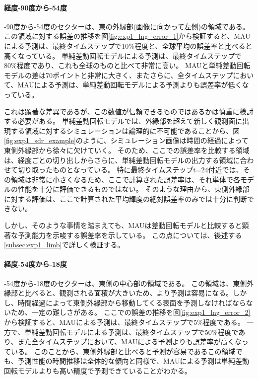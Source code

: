           \paragraph{経度-90度から-54度}
          -90度から-54度のセクターは、東の外縁部(画像に向かって左側)の領域である。
          この領域に対する誤差の推移を図\ref{fig:exp1_lng_error_1}から検証すると、MAUによる予測は、最終タイムステップで10\%程度と、全球平均の誤差率と比べると高くなっている。
          単純差動回転モデルによる予測は、最終タイムステップで80\%程度であり、これも全球のものと比べて非常に高い。
          MAUと単純差動回転モデルの差は70ポイントと非常に大きく、またさらに、全タイムステップにおいて、MAUによる予測は、単純差動回転モデルによる予測よりも誤差率が低くなっている。

          これは顕著な差異であるが、この数値が信頼できるものではあるかは慎重に検討する必要がある。
          単純差動回転モデルでは、外縁部を超えて新しく観測面に出現する領域に対するシミュレーションは論理的に不可能であることから、図\ref{fig:exp1_sdr_example}のように、シミュレーション画像は時間の経過によって東側外縁部から徐々に欠けていく。
          そのため、ここでの誤差率を比較する領域は、経度ごとの切り出しからさらに、単純差動回転モデルの出力する領域に合わせて切り取ったものとなっている。
          特に最終タイムステップt=24付近では、その領域は非常に小さくなるため、ここで計算された誤差率は、それ単体で各モデルの性能を十分に評価できるものではない。
          そのような理由から、東側外縁部に対する評価は、ここで計算された平均輝度の絶対誤差率のみでは十分に判断できない。
          
          しかし、そのような事情を踏まえても、MAUは差動回転モデルと比較すると顕著な予測能力を示唆する誤差率を示している。
          この点については、後述する\ref{subsec:exp1_limb}で詳しく検証する。

          \paragraph{経度-54度から-18度}
          -54度から-18度のセクターは、東側の中心部の領域である。
          この領域は、東側外縁部と比べると、観測される面積が大きいため、より予測は容易になる。しかし、時間経過によって東側外縁部から移動してくる表面を予測しなければならないため、一定の難しさがある。
          ここでの誤差の推移を図\ref{fig:exp1_lng_error_2}から検証すると、MAUによる予測は、最終タイムステップで5\%程度である。
          一方で、単純差動回転モデルによる予測は、最終タイムステップで50\%程度であり、また全タイムステップにおいて、MAUによる予測よりも誤差率が高くなっている。
          このことから、東側外縁部と比べると予測が容易であるこの領域でも、予測性能の時間推移は全体的な傾向と同様で、MAUによる予測は単純差動回転モデルよりも高い精度で予測できていることがわかる。

